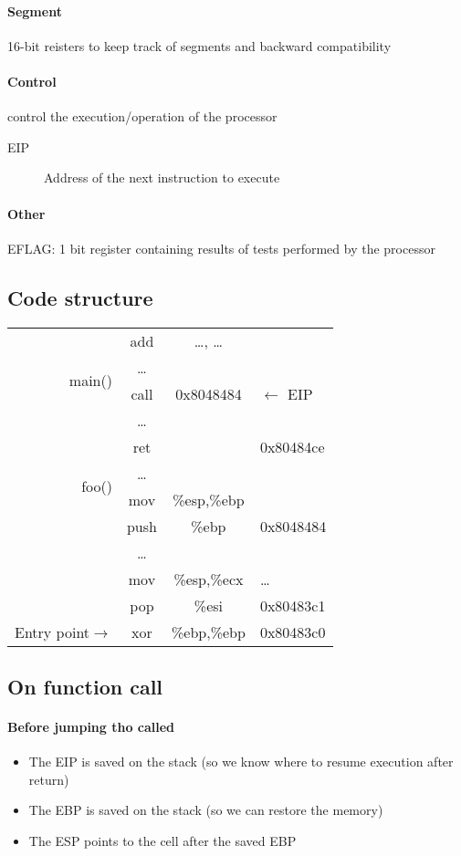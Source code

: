 \documentclass{article}
\begin{document}
\paragraph{Segment} 16-bit reisters to keep track of segments and backward compatibility
\paragraph{Control} control the execution/operation of the processor
\begin{description}
\item[EIP] Address of the next instruction to execute
\end{description}
\paragraph{Other} EFLAG: 1 bit register containing results of tests performed by the processor
\subsection{Code structure}
\begin{tabularx}{0.5\linewidth}{r|cc|l}
\cline{2-3}
\multirow{4}{*}{main()}&add&\dots , \dots &\\
\cline{2-3}
&\dots &&\\
\cline{2-3}
&call&0x8048484&$\leftarrow$ EIP\\
\cline{2-3}
&\dots &&\\
\cline{1-3}
\multirow{4}{*}{foo()}&ret&&0x80484ce\\
\cline{2-3}
&\dots &&\\
\cline{2-3}
&mov&\%esp,\%ebp&\\
\cline{2-3}
&push&\%ebp&0x8048484\\
\cline{1-3}
&\dots &&\\
\cline{2-3}
&mov&\%esp,\%ecx&\dots\\
\cline{2-3}
&pop&\%esi&0x80483c1\\
\cline{2-3}
Entry point$\rightarrow$&xor&\%ebp,\%ebp&0x80483c0\\
\cline{2-3}
\end{tabularx}
\subsection{On function call}
\paragraph{Before jumping tho called}
\begin{itemize}
\item The EIP is saved on the stack (so we know where to resume execution after return)
\item The EBP is saved on the stack (so we can restore the memory)
\item The ESP points to the cell after the saved EBP
\end{itemize}
\end{document}
